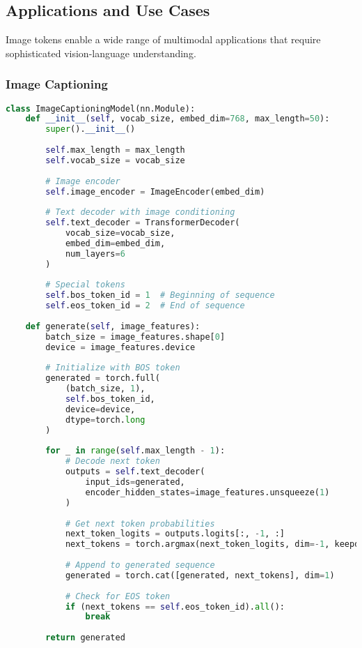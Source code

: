 \subsection{Applications and Use Cases}

Image tokens enable a wide range of multimodal applications that require sophisticated vision-language understanding.

\subsubsection{Image Captioning}

\begin{lstlisting}[language=Python, caption=Image captioning with image tokens]
class ImageCaptioningModel(nn.Module):
    def __init__(self, vocab_size, embed_dim=768, max_length=50):
        super().__init__()
        
        self.max_length = max_length
        self.vocab_size = vocab_size
        
        # Image encoder
        self.image_encoder = ImageEncoder(embed_dim)
        
        # Text decoder with image conditioning
        self.text_decoder = TransformerDecoder(
            vocab_size=vocab_size,
            embed_dim=embed_dim,
            num_layers=6
        )
        
        # Special tokens
        self.bos_token_id = 1  # Beginning of sequence
        self.eos_token_id = 2  # End of sequence
    
    def generate(self, image_features):
        batch_size = image_features.shape[0]
        device = image_features.device
        
        # Initialize with BOS token
        generated = torch.full(
            (batch_size, 1), 
            self.bos_token_id, 
            device=device, 
            dtype=torch.long
        )
        
        for _ in range(self.max_length - 1):
            # Decode next token
            outputs = self.text_decoder(
                input_ids=generated,
                encoder_hidden_states=image_features.unsqueeze(1)
            )
            
            # Get next token probabilities
            next_token_logits = outputs.logits[:, -1, :]
            next_tokens = torch.argmax(next_token_logits, dim=-1, keepdim=True)
            
            # Append to generated sequence
            generated = torch.cat([generated, next_tokens], dim=1)
            
            # Check for EOS token
            if (next_tokens == self.eos_token_id).all():
                break
        
        return generated
\end{lstlisting}

